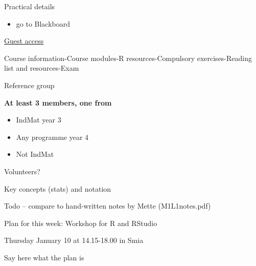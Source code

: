 \documentclass[10pt,ignorenonframetext,]{beamer}
\providecommand{\tightlist}{%
  \setlength{\itemsep}{0pt}\setlength{\parskip}{0pt}}
\begin{document}
\begin{frame}{Practical details}

\begin{itemize}
\tightlist
\item
  go to Blackboard
\end{itemize}

\href{https://ntnu.blackboard.com/webapps/blackboard/execute/modulepage/view?course_id=_7960_1\&cmp_tab_id=_40192_1\&mode=view}{Guest
access}

Course information-Course modules-R resources-Compulsory
exercises-Reading list and resources-Exam

\end{frame}

\begin{frame}{Reference group}

\textbf{At least 3 members, one from}

\begin{itemize}
\tightlist
\item
  IndMat year 3
\item
  Any programme year 4
\item
  Not IndMat
\end{itemize}

Volunteers?

\end{frame}

\begin{frame}{Key concepts (stats) and notation}

\begin{block}{Todo -- compare to hand-written notes by Mette
(M1L1notes.pdf)}

\end{block}

\end{frame}

\begin{frame}{Plan for this week: Workshop for R and RStudio}

\begin{block}{Thursday January 10 at 14.15-18.00 in Smia}

Say here what the plan is

\end{block}

\end{frame}
\end{document}
